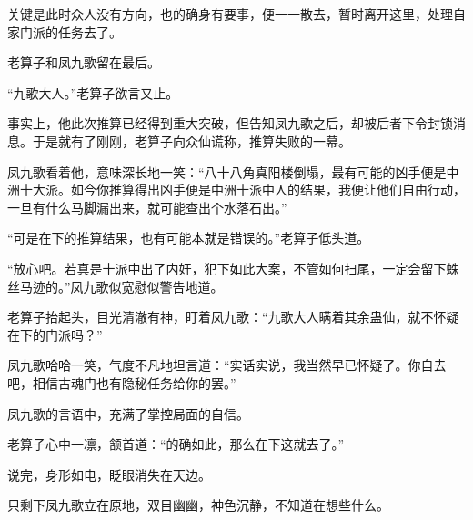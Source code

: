 \begin{this_body}
关键是此时众人没有方向，也的确身有要事，便一一散去，暂时离开这里，处理自家门派的任务去了。

老算子和凤九歌留在最后。

“九歌大人。”老算子欲言又止。

事实上，他此次推算已经得到重大突破，但告知凤九歌之后，却被后者下令封锁消息。于是就有了刚刚，老算子向众仙谎称，推算失败的一幕。

凤九歌看着他，意味深长地一笑：“八十八角真阳楼倒塌，最有可能的凶手便是中洲十大派。如今你推算得出凶手便是中洲十派中人的结果，我便让他们自由行动，一旦有什么马脚漏出来，就可能查出个水落石出。”

“可是在下的推算结果，也有可能本就是错误的。”老算子低头道。

“放心吧。若真是十派中出了内奸，犯下如此大案，不管如何扫尾，一定会留下蛛丝马迹的。”凤九歌似宽慰似警告地道。

老算子抬起头，目光清澈有神，盯着凤九歌：“九歌大人瞒着其余蛊仙，就不怀疑在下的门派吗？”

凤九歌哈哈一笑，气度不凡地坦言道：“实话实说，我当然早已怀疑了。你自去吧，相信古魂门也有隐秘任务给你的罢。”

凤九歌的言语中，充满了掌控局面的自信。

老算子心中一凛，颔首道：“的确如此，那么在下这就去了。”

说完，身形如电，眨眼消失在天边。

只剩下凤九歌立在原地，双目幽幽，神色沉静，不知道在想些什么。

\end{this_body}

